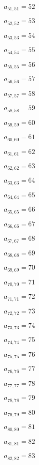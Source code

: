 \documentclass[a4paper,12pt]{article}
\begin{document}
$a _{ 51, 51 } = 52$

$a _{ 52, 52 } = 53$

$a _{ 53, 53 } = 54$

$a _{ 54, 54 } = 55$

$a _{ 55, 55 } = 56$

$a _{ 56, 56 } = 57$

$a _{ 57, 57 } = 58$

$a _{ 58, 58 } = 59$

$a _{ 59, 59 } = 60$

$a _{ 60, 60 } = 61$

$a _{ 61, 61 } = 62$

$a _{ 62, 62 } = 63$

$a _{ 63, 63 } = 64$

$a _{ 64, 64 } = 65$

$a _{ 65, 65 } = 66$

$a _{ 66, 66 } = 67$

$a _{ 67, 67 } = 68$

$a _{ 68, 68 } = 69$

$a _{ 69, 69 } = 70$

$a _{ 70, 70 } = 71$

$a _{ 71, 71 } = 72$

$a _{ 72, 72 } = 73$

$a _{ 73, 73 } = 74$

$a _{ 74, 74 } = 75$

$a _{ 75, 75 } = 76$

$a _{ 76, 76 } = 77$

$a _{ 77, 77 } = 78$

$a _{ 78, 78 } = 79$

$a _{ 79, 79 } = 80$

$a _{ 80, 80 } = 81$

$a _{ 81, 81 } = 82$

$a _{ 82, 82 } = 83$
\end{document}
